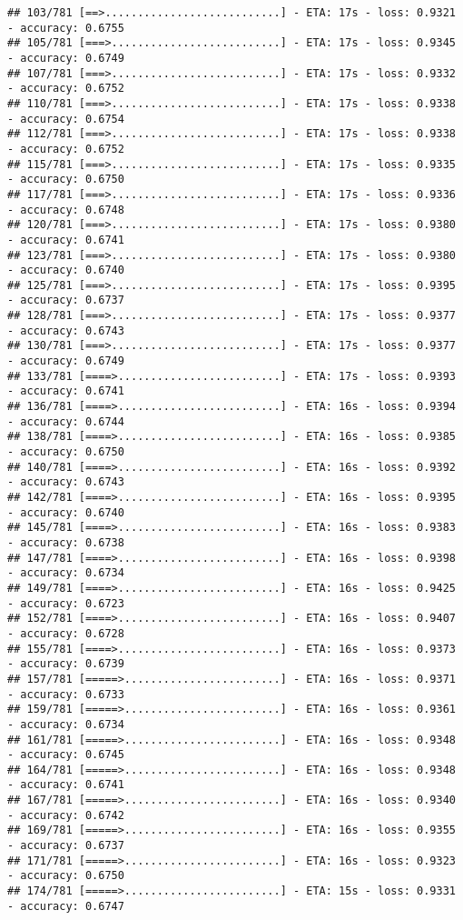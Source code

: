 \documentclass[
]{article}
\begin{document}
\begin{verbatim}
## 103/781 [==>...........................] - ETA: 17s - loss: 0.9321 - accuracy: 0.6755
## 105/781 [===>..........................] - ETA: 17s - loss: 0.9345 - accuracy: 0.6749
## 107/781 [===>..........................] - ETA: 17s - loss: 0.9332 - accuracy: 0.6752
## 110/781 [===>..........................] - ETA: 17s - loss: 0.9338 - accuracy: 0.6754
## 112/781 [===>..........................] - ETA: 17s - loss: 0.9338 - accuracy: 0.6752
## 115/781 [===>..........................] - ETA: 17s - loss: 0.9335 - accuracy: 0.6750
## 117/781 [===>..........................] - ETA: 17s - loss: 0.9336 - accuracy: 0.6748
## 120/781 [===>..........................] - ETA: 17s - loss: 0.9380 - accuracy: 0.6741
## 123/781 [===>..........................] - ETA: 17s - loss: 0.9380 - accuracy: 0.6740
## 125/781 [===>..........................] - ETA: 17s - loss: 0.9395 - accuracy: 0.6737
## 128/781 [===>..........................] - ETA: 17s - loss: 0.9377 - accuracy: 0.6743
## 130/781 [===>..........................] - ETA: 17s - loss: 0.9377 - accuracy: 0.6749
## 133/781 [====>.........................] - ETA: 17s - loss: 0.9393 - accuracy: 0.6741
## 136/781 [====>.........................] - ETA: 16s - loss: 0.9394 - accuracy: 0.6744
## 138/781 [====>.........................] - ETA: 16s - loss: 0.9385 - accuracy: 0.6750
## 140/781 [====>.........................] - ETA: 16s - loss: 0.9392 - accuracy: 0.6743
## 142/781 [====>.........................] - ETA: 16s - loss: 0.9395 - accuracy: 0.6740
## 145/781 [====>.........................] - ETA: 16s - loss: 0.9383 - accuracy: 0.6738
## 147/781 [====>.........................] - ETA: 16s - loss: 0.9398 - accuracy: 0.6734
## 149/781 [====>.........................] - ETA: 16s - loss: 0.9425 - accuracy: 0.6723
## 152/781 [====>.........................] - ETA: 16s - loss: 0.9407 - accuracy: 0.6728
## 155/781 [====>.........................] - ETA: 16s - loss: 0.9373 - accuracy: 0.6739
## 157/781 [=====>........................] - ETA: 16s - loss: 0.9371 - accuracy: 0.6733
## 159/781 [=====>........................] - ETA: 16s - loss: 0.9361 - accuracy: 0.6734
## 161/781 [=====>........................] - ETA: 16s - loss: 0.9348 - accuracy: 0.6745
## 164/781 [=====>........................] - ETA: 16s - loss: 0.9348 - accuracy: 0.6741
## 167/781 [=====>........................] - ETA: 16s - loss: 0.9340 - accuracy: 0.6742
## 169/781 [=====>........................] - ETA: 16s - loss: 0.9355 - accuracy: 0.6737
## 171/781 [=====>........................] - ETA: 16s - loss: 0.9323 - accuracy: 0.6750
## 174/781 [=====>........................] - ETA: 15s - loss: 0.9331 - accuracy: 0.6747

\end{verbatim}
\end{document}
